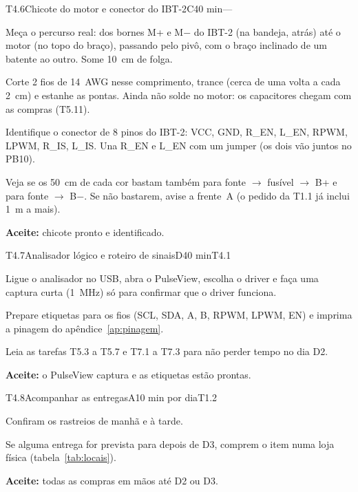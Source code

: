 \documentclass[11pt,a4paper]{article}
\newcommand{\cmd}[1]{\texttt{\detokenize{#1}}}   %
\newcommand{\flecha}{\ensuremath{\rightarrow}}
\begin{document}
\begin{tarefa}{T4.6}{Chicote do motor e conector do IBT-2}{C}{40 min}{---}
\begin{passos}
  \item Meça o percurso real: dos bornes M+ e M$-$ do IBT-2 (na bandeja, atrás) até o motor
    (no topo do braço), passando pelo pivô, com o braço inclinado de um batente ao outro.
    Some 10~cm de folga.
  \item Corte 2 fios de 14~AWG nesse comprimento, trance (cerca de uma volta a cada 2~cm) e
    estanhe as pontas. Ainda não solde no motor: os capacitores chegam com as compras
    (T5.11).
  \item Identifique o conector de 8 pinos do IBT-2: VCC, GND, R\_EN, L\_EN, RPWM, LPWM,
    R\_IS, L\_IS. Una R\_EN e L\_EN com um jumper (os dois vão juntos no PB10).
  \item Veja se os 50~cm de cada cor bastam também para fonte \flecha{} fusível
    \flecha{} B+ e para fonte \flecha{} B$-$. Se não bastarem, avise a frente~A (o pedido da T1.1
    já inclui 1~m a mais).
\end{passos}
\textbf{Aceite:} chicote pronto e identificado.
\end{tarefa}

\begin{tarefa}{T4.7}{Analisador lógico e roteiro de sinais}{D}{40 min}{T4.1}
\begin{passos}
  \item Ligue o analisador no USB, abra o PulseView, escolha o driver \cmd{fx2lafw} e faça uma
    captura curta (1~MHz) só para confirmar que o driver funciona.
  \item Prepare etiquetas para os fios (SCL, SDA, A, B, RPWM, LPWM, EN) e imprima a pinagem
    do apêndice~\ref{ap:pinagem}.
  \item Leia as tarefas T5.3 a T5.7 e T7.1 a T7.3 para não perder tempo no dia D2.
\end{passos}
\textbf{Aceite:} o PulseView captura e as etiquetas estão prontas.
\end{tarefa}

\begin{tarefa}{T4.8}{Acompanhar as entregas}{A}{10 min por dia}{T1.2}
\begin{passos}
  \item Confiram os rastreios de manhã e à tarde.
  \item Se alguma entrega for prevista para depois de D3, comprem o item numa loja física
    (tabela~\ref{tab:locais}).
\end{passos}
\textbf{Aceite:} todas as compras em mãos até D2 ou D3.
\end{tarefa}
\end{document}
